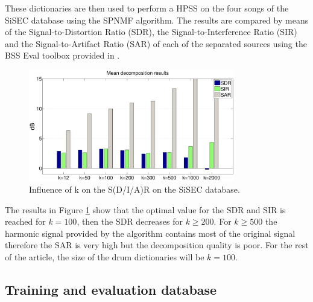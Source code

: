 \documentclass{article}
\begin{document}
These dictionaries are then used to perform a HPSS on the four songs of the SiSEC database using the SPNMF algorithm. The results are compared by means of the Signal-to-Distortion Ratio (SDR), the Signal-to-Interference Ratio (SIR) and the Signal-to-Artifact Ratio (SAR) of each of the separated sources using the BSS Eval toolbox provided in \cite{bsseval}.

\begin{figure}[h]

  \centering 
  \includegraphics[width=9cm]{figs/AllDictSizeISMIR.eps}
  \caption{\label{dictsize}Influence of k on the S(D/I/A)R on the SiSEC database.}
  
\end{figure}

The results in Figure \ref{dictsize} show that the optimal value for the SDR and SIR is reached for $k=100$, then the SDR decreases for $k\geqslant 200$. For $k\geqslant 500$ the harmonic signal provided by the algorithm contains most of the original signal therefore the SAR is very high but the decomposition quality is poor. For the rest of the article, the size of the drum dictionaries will be $k=100$.

\subsection{Training and evaluation database}\label{database}
\end{document}
